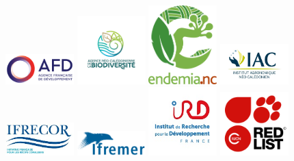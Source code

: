 \documentclass[
  11pt,
  letterpaper,
]{scrreprt}
\begin{document}
\begin{figure}

\begin{minipage}{\linewidth}
\includegraphics[width=1.04167in,height=\textheight]{./ressources/logos/AFD.png}
\includegraphics[width=1.04167in,height=\textheight]{./ressources/logos/ANCB.png}
\includegraphics[width=1.04167in,height=\textheight]{./ressources/logos/Endemia_CARRE.png}
\includegraphics[width=1.04167in,height=\textheight]{./ressources/logos/IAC.jpg}
\includegraphics[width=1.04167in,height=\textheight]{./ressources/logos/ifrecor.jpg}
\includegraphics[width=1.04167in,height=\textheight]{./ressources/logos/Ifremer.png}
\includegraphics[width=1.04167in,height=\textheight]{./ressources/logos/IRD_160.jpg}
\includegraphics[width=1.04167in,height=\textheight]{./ressources/logos/IUCN_Red_List.png}

\end{minipage}
\end{figure}
\end{document}
